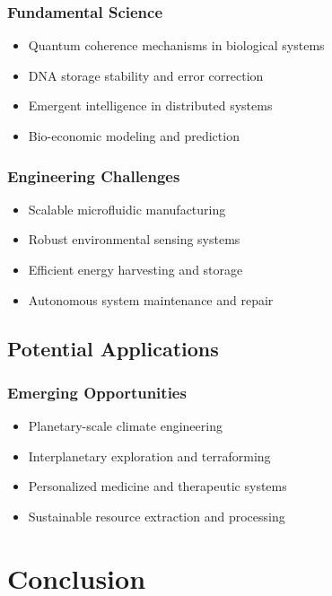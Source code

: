 \documentclass[11pt,a4paper]{article}
\begin{document}
\subsubsection{Fundamental Science}
\begin{itemize}
    \item Quantum coherence mechanisms in biological systems
    \item DNA storage stability and error correction
    \item Emergent intelligence in distributed systems
    \item Bio-economic modeling and prediction
\end{itemize}

\subsubsection{Engineering Challenges}
\begin{itemize}
    \item Scalable microfluidic manufacturing
    \item Robust environmental sensing systems
    \item Efficient energy harvesting and storage
    \item Autonomous system maintenance and repair
\end{itemize}

\subsection{Potential Applications}

\subsubsection{Emerging Opportunities}
\begin{itemize}
    \item Planetary-scale climate engineering
    \item Interplanetary exploration and terraforming
    \item Personalized medicine and therapeutic systems
    \item Sustainable resource extraction and processing
\end{itemize}

\section{Conclusion}
\end{document}
